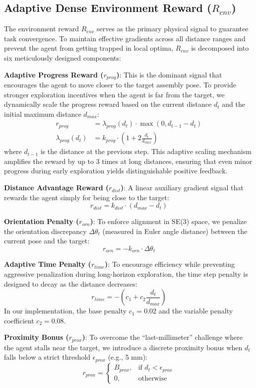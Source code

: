 \documentclass[conference]{IEEEtran}
\begin{document}
\subsection{Adaptive Dense Environment Reward ($R_{env}$)}
The environment reward $R_{env}$ serves as the primary physical signal to guarantee task convergence. To maintain effective gradients across all distance ranges and prevent the agent from getting trapped in local optima, $R_{env}$ is decomposed into six meticulously designed components:

\textbf{Adaptive Progress Reward ($r_{prog}$)}: This is the dominant signal that encourages the agent to move closer to the target assembly pose. To provide stronger exploration incentives when the agent is far from the target, we dynamically scale the progress reward based on the current distance $d_t$ and the initial maximum distance $d_{max}$:
\begin{align}
r_{prog} &= \lambda_{prog}(d_t) \cdot \max(0, d_{t-1} - d_t) \\
\lambda_{prog}(d_t) &= k_{prog} \cdot \left( 1 + 2 \frac{d_t}{d_{max}} \right)
\end{align}
where $d_{t-1}$ is the distance at the previous step. This adaptive scaling mechanism amplifies the reward by up to 3 times at long distances, ensuring that even minor progress during early exploration yields distinguishable positive feedback.

\textbf{Distance Advantage Reward ($r_{dist}$)}: A linear auxiliary gradient signal that rewards the agent simply for being close to the target:
$$r_{dist} = k_{dist} \cdot (d_{max} - d_t)$$

\textbf{Orientation Penalty ($r_{orn}$)}: To enforce alignment in SE(3) space, we penalize the orientation discrepancy $\Delta \theta_t$ (measured in Euler angle distance) between the current pose and the target:
$$r_{orn} = - k_{orn} \cdot \Delta \theta_t$$

\textbf{Adaptive Time Penalty ($r_{time}$)}: To encourage efficiency while preventing aggressive penalization during long-horizon exploration, the time step penalty is designed to decay as the distance decreases:
$$r_{time} = - \left( c_1 + c_2 \frac{d_t}{d_{max}} \right)$$
In our implementation, the base penalty $c_1=0.02$ and the variable penalty coefficient $c_2=0.08$.

\textbf{Proximity Bonus ($r_{prox}$)}: To overcome the ``last-millimeter'' challenge where the agent stalls near the target, we introduce a discrete proximity bonus when $d_t$ falls below a strict threshold $\epsilon_{prox}$ (e.g., 5 mm):
$$r_{prox} = \begin{cases} B_{prox}, & \text{if } d_t < \epsilon_{prox} \\ 0, & \text{otherwise} \end{cases}$$
\end{document}
